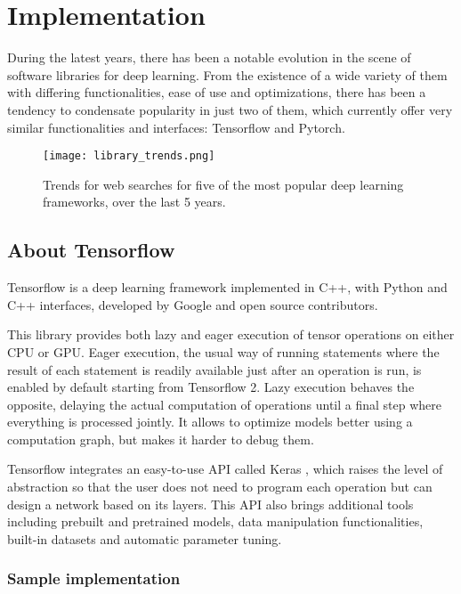 \section{Implementation}

During the latest years, there has been a notable evolution in the scene of software libraries for deep learning. From the existence of a wide variety of them with differing functionalities, ease of use and optimizations, there has been a tendency to condensate popularity in just two of them, which currently offer very similar functionalities and interfaces: Tensorflow and Pytorch.

\begin{figure*}[htbp]
    \centering  
    \texttt{[image: library\_trends.png]}
    \caption{Trends for web searches for five of the most popular deep learning frameworks, over the last 5 years.}
    \label{fig:trends}
\end{figure*}

\subsection{About Tensorflow}

Tensorflow is a deep learning framework implemented in C++, with Python and C++ interfaces, developed by Google and open source contributors.

This library provides both lazy and eager execution of tensor operations on either CPU or GPU. Eager execution, the usual way of running statements where the result of each statement is readily available just after an operation is run, is enabled by default starting from Tensorflow 2. Lazy execution behaves the opposite, delaying the actual computation of operations until a final step where everything is processed jointly. It allows to optimize models better using a computation graph, but makes it harder to debug them.

Tensorflow integrates an easy-to-use API called Keras , which raises the level of abstraction so that the user does not need to program each operation but can design a network based on its layers. This API also brings additional tools including prebuilt and pretrained models, data manipulation functionalities, built-in datasets and automatic parameter tuning.

\subsubsection{Sample implementation}

